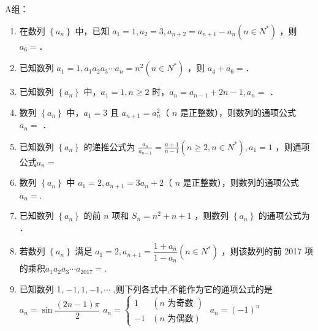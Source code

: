 A组：
\begin{enumerate}

    \item 在数列 $\left\{a_n\right\}$ 中，已知 $a_1=1, a_2=3, a_{n+2}=a_{n+1}-a_n\left(n \in N^*\right)$ ，则 $a_6=$．

    \item 已知数列 $a_1=1, a_1 a_2 a_3 \cdots a_n=n^2\left(n \in N^*\right)$ ，则 $a_4+a_6=$．

    \item 已知数列 $\left\{a_n\right\}$ 中，$a_1=1, n \geq 2$ 时，$a_n=a_{n-1}+2 n-1, a_n=$ ．

    \item 数列 $\left\{a_n\right\}$ 中，$a_1=3$ 且 $a_{n+1}=a_n^2$（ $n$ 是正整数），则数列的通项公式 $a_n=$ ．

    \item 已知数列 $\left\{a_n\right\}$ 的递推公式为 $\frac{a_n}{a_{n-1}}=\frac{n+1}{n-1}\left(n \geq 2, n \in N^*\right), a_1=1$ ，则通项公式$a_n=$

    \item 数列 $\left\{a_n\right\}$ 中 $a_1=2, a_{n+1}=3 a_n+2$（ $n$ 是正整数），则数列的通项公式$a_n=$.

    \item 已知数列 $\left\{a_n\right\}$ 的前 $n$ 项和 $S_n=n^2+n+1$ ，则数列 $\left\{a_n\right\}$ 的通项公式为 ．

    \item 若数列 $\left\{a_n\right\}$ 满足 $a_1=2, a_{n+1}=\dfrac{1+a_n}{1-a_n}\left(n \in N^*\right)$ ，则该数列的前 2017 项的乘积$a_1 a_2 a_3 \cdots a_{2017}=$.

    \item 已知数列 1, $- 1,1, - 1,\cdots$ ,则下列各式中,不能作为它的通项公式的是     
    {${a}_{n} = \sin \dfrac{\left( {{2n} - 1}\right) \pi }
    {2}$}
    {${a}_{n} = \left\{ \begin{array}{ll}
                        1 & \left( {n\text{ 为奇数 }}\right) \\   
                        -1 & \left( {n\text{ 为偶数}}\right)
                        \end{array} \right.$}
    {${a}_{n} = \left( -1\right)^n$}

    \end{enumerate}

